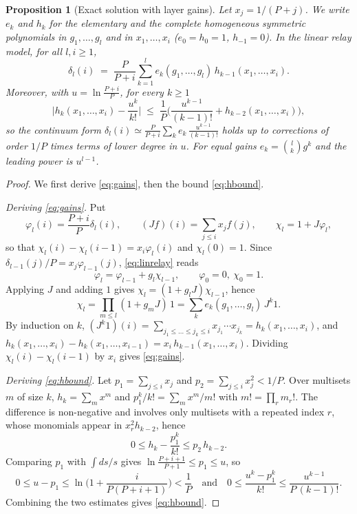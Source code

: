 \documentclass[11pt]{article}
\newtheorem{proposition}{Proposition}
\theoremstyle{definition}
\theoremstyle{remark}
\begin{document}
\begin{proposition}[Exact solution with layer gains]\label{prop:gains}
Let $x_j=1/(P+j)$. We write $e_k$ and $h_k$ for the elementary and the complete homogeneous symmetric polynomials in $g_1,\dots,g_l$ and in $x_1,\dots,x_i$ ($e_0=h_0=1$, $h_{-1}=0$). In the linear relay model, for all $l,i\ge1$,
\begin{equation}\label{eq:gains}
  \delta_l(i)\;=\;\frac{P}{P+i}\sum_{k=1}^{l}e_k(g_1,\dots,g_l)\,h_{k-1}(x_1,\dots,x_i).
\end{equation}
Moreover, with $u=\ln\frac{P+i}{P}$, for every $k\ge1$
\begin{equation}\label{eq:hbound}
  \Big|h_k(x_1,\dots,x_i)-\frac{u^k}{k!}\Big|\;\le\;\frac1P\Big(\frac{u^{k-1}}{(k-1)!}+h_{k-2}(x_1,\dots,x_i)\Big),
\end{equation}
so the continuum form $\delta_l(i)\simeq\frac{P}{P+i}\sum_ke_k\,\frac{u^{k-1}}{(k-1)!}$ holds up to corrections of order $1/P$ times terms of lower degree in $u$. For equal gains $e_k=\binom lkg^k$ and the leading power is $u^{l-1}$.
\end{proposition}
\begin{proof}
We first derive \eqref{eq:gains}, then the bound \eqref{eq:hbound}.

\emph{Deriving \eqref{eq:gains}.} Put
\[
\varphi_l(i)=\frac{P+i}{P}\delta_l(i),\qquad
(Jf)(i)=\sum_{j\le i}x_jf(j),\qquad
\chi_l=1+J\varphi_l,
\]
so that $\chi_l(i)-\chi_l(i-1)=x_i\varphi_l(i)$ and $\chi_l(0)=1$. Since $\delta_{l-1}(j)/P=x_j\varphi_{l-1}(j)$, \eqref{eq:linrelay} reads
\[
\varphi_l=\varphi_{l-1}+g_l\chi_{l-1},\qquad\varphi_0=0,\ \chi_0=1.
\]
Applying $J$ and adding $1$ gives $\chi_l=(1+g_lJ)\chi_{l-1}$, hence
\[
\chi_l=\prod_{m\le l}(1+g_mJ)\,1=\sum_{k}e_k(g_1,\dots,g_l)\,J^k1.
\]
By induction on $k$, $(J^k1)(i)=\sum_{j_1\le\dots\le j_k\le i}x_{j_1}\cdots x_{j_k}=h_k(x_1,\dots,x_i)$, and $h_k(x_1,\dots,x_i)-h_k(x_1,\dots,x_{i-1})=x_i\,h_{k-1}(x_1,\dots,x_i)$. Dividing $\chi_l(i)-\chi_l(i-1)$ by $x_i$ gives \eqref{eq:gains}.

\emph{Deriving \eqref{eq:hbound}.} Let $p_1=\sum_{j\le i}x_j$ and $p_2=\sum_{j\le i}x_j^2<1/P$. Over multisets $m$ of size $k$, $h_k=\sum_mx^m$ and $p_1^k/k!=\sum_mx^m/m!$ with $m!=\prod_rm_r!$. The difference is non-negative and involves only multisets with a repeated index $r$, whose monomials appear in $x_r^2h_{k-2}$, hence
\[
0\le h_k-\frac{p_1^k}{k!}\le p_2\,h_{k-2}.
\]
Comparing $p_1$ with $\int ds/s$ gives $\ln\frac{P+i+1}{P+1}\le p_1\le u$, so
\[
0\le u-p_1\le\ln\Big(1+\frac{i}{P(P+i+1)}\Big)<\frac1P
\quad\text{and}\quad
0\le\frac{u^k-p_1^k}{k!}\le\frac{u^{k-1}}{P\,(k-1)!}.
\]
Combining the two estimates gives \eqref{eq:hbound}.
\end{proof}
\end{document}
